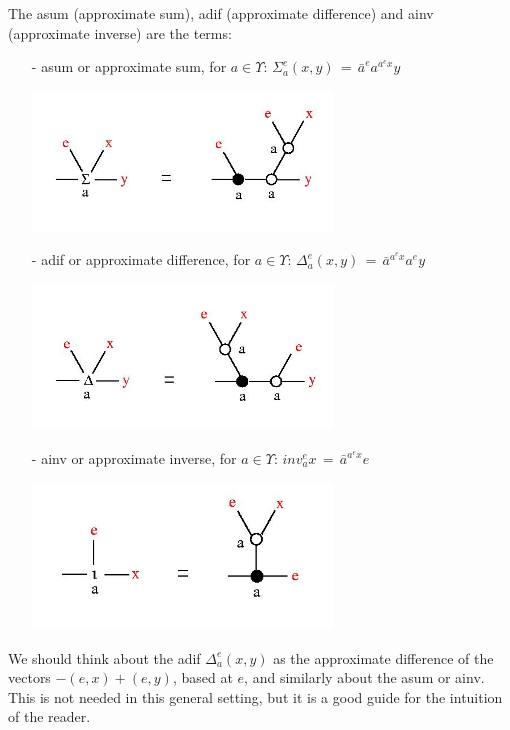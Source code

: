 \documentclass{article}
\begin{document}
\begin{definition}
The asum (approximate sum), adif (approximate difference) and ainv (approximate inverse) are the terms: 
\begin{enumerate}
\item[-] asum or approximate sum, for $a \in \Upsilon$: $\displaystyle \Sigma_{a}^{e}(x,y) \, = \, \bar{a}^{e} a^{a^{e} x} y$

\centerline{\includegraphics[width=80mm]{jpg/asum.jpg}}  
\item[-] adif or approximate difference, for $a \in \Upsilon$: $\displaystyle \Delta_{a}^{e}(x,y) \, = \, \bar{a}^{a^{e} x} a^{e} y$

\centerline{\includegraphics[width=80mm]{jpg/adif.jpg}}  
\item[-] ainv or approximate inverse, for $a \in \Upsilon$: $\displaystyle inv_{a}^{e} x \, = \, \bar{a}^{a^{e} x} e$

\centerline{\includegraphics[width=80mm]{jpg/ainv.jpg}}  
\end{enumerate}
\label{aterms}
\end{definition}

We should think about the adif $\displaystyle \Delta_{a}^{e}(x,y)$ as the approximate difference of the vectors $-(e,x)+(e,y)$, based at $e$, and similarly about the asum or ainv. This is not needed in this general setting, but it is a good guide for the intuition of the reader. 
\end{document}
